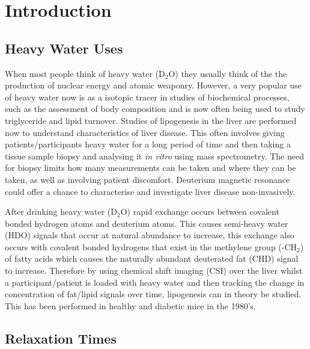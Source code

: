\documentclass[class=article, crop=false]{standalone}
\begin{document}
 
\label{Chap:D2O}

\section{Introduction}

\subsection{Heavy Water Uses}

When most people think of heavy water (D$_{2}$O) they usually think of the the production of nuclear energy and atomic weaponry. However, a very popular use of heavy water now is as a isotopic tracer in studies of biochemical processes, such as the assessment of body composition\cite{INTERNATIONALATOMICENERGYAGENCY2011IntroductionSpectrometry} and is now often being used to study triglyceride\cite{Strawford2004AdiposeO} and lipid turnover\cite{Wilkinson2017StableFuture}. Studies of lipogenesis in the liver are performed now to understand characteristics of liver disease\cite{Turner2003MeasurementMIDA}. This often involves giving patients/participants heavy water for a long period of time and then taking a tissue sample biopsy and analysing it \textit{in vitro} using mass spectrometry. The need for biopsy limits how many measurements can be taken and where they can be taken, as well as involving patient discomfort. Deuterium magnetic resonance could offer a chance to characterise and investigate liver disease non-invasively. 

After drinking heavy water (D$_2$O) rapid exchange occurs between covalent bonded hydrogen atoms and deuterium atoms. This causes semi-heavy water (HDO) signals that occur at natural abundance to increase, this exchange also occurs with covalent bonded hydrogens that exist in the methylene group (-CH$_2$) of fatty acids which causes the naturally abundant deuterated fat (CHD) signal to increase. Therefore by using chemical shift imaging (CSI) over the liver whilst a participant/patient is loaded with heavy water and then tracking the change in concentration of fat/lipid signals over time, lipogenesis can in theory be studied. This has been performed in healthy and diabetic mice in the 1980's\cite{Brereton1986PreliminarySpectroscopy,Brereton1989TheMice}.

\subsection{Relaxation Times}
\end{document}
